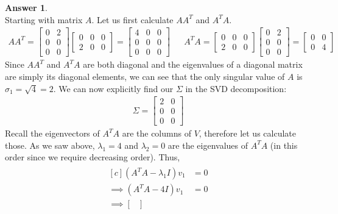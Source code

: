 \documentclass[10pt,a4paper]{article}
\theoremstyle{definition}
\newtheorem*{answer*}{Answer}
\theoremstyle{definition}
\numberwithin{equation}{section}
\begin{document}
\begin{answer*}$ $
\\Starting with matrix $A$. Let us first calculate $AA^T$ and $A^T A$. 
\begin{align*}
A A^T = \begin{bmatrix}
0 & 2\\
0 & 0\\
0 & 0
\end{bmatrix} \begin{bmatrix}
0 & 0 & 0\\
2 & 0 & 0
\end{bmatrix}
= \begin{bmatrix}
4 & 0 & 0\\
0 & 0 & 0\\
0 & 0 & 0
\end{bmatrix} && A^T A = \begin{bmatrix}
0 & 0 & 0\\
2 & 0 & 0
\end{bmatrix} \begin{bmatrix}
0 & 2\\
0 & 0\\
0 & 0
\end{bmatrix} = \begin{bmatrix}
0 & 0\\
0 & 4
\end{bmatrix}
\end{align*}
Since $AA^T$ and $A^TA$ are both diagonal and the eigenvalues of a diagonal matrix are simply its diagonal elements, we can see that the only singular value of $A$ is $\sigma_1 = \sqrt{4} = 2$. We can now explicitly find our $\Sigma$ in the SVD decomposition:
\begin{align*}
\Sigma = \begin{bmatrix}
2 & 0\\
0 & 0\\
0 & 0
\end{bmatrix}
\end{align*}
Recall the eigenvectors of $A^TA$ are the columns of $V$, therefore let us calculate those. As we saw above, $\lambda_1 = 4$ and $\lambda_2 = 0$ are the eigenvalues of $A^TA$ (in this order since we require decreasing order). Thus, 
\begin{align*}
\begin{aligned}[c]
(A^T A - \lambda_1 I)v_1 &= 0\\
\implies (A^TA - 4I) v_1 &= 0\\
\implies \begin{bmatrix}

\end{bmatrix}
\end{aligned}
\end{align*}
\end{answer*}
\end{document}
